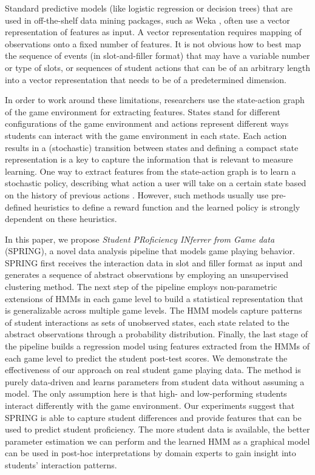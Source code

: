 \documentclass{sigchi}
\def\algname{SPRING\xspace}
\begin{document}
  

Standard predictive models (like logistic regression or decision trees)  that are used in off-the-shelf data mining packages, such as Weka \cite{hall2009weka}, often use a vector representation of features as input. 
A vector representation requires mapping of observations onto a fixed number of features.
It is not obvious how to best map the sequence of events (in slot-and-filler format) that may have a variable number or type of slots, or sequences of student actions that can be of an arbitrary length into a vector representation that needs to be of a predetermined dimension.

In order to work around these limitations, researchers use the state-action graph of the game environment for extracting features. 
States stand for different configurations of the game environment and actions represent different ways students can interact with the game environment in each state.
Each action results in a (stochastic) transition between states and defining a compact state representation is a key to capture the information that is relevant to measure learning.
One way to extract features from the state-action graph is to learn a stochastic policy, describing what action a user will take on a certain state based on the history of previous actions \cite{lee2014learning, liu2013predicting}.
However, such methods usually use pre-defined heuristics to define a reward function and the learned policy is strongly dependent on these
heuristics.

In this paper, we propose \textit{Student PRoficiency INferrer from Game data} (SPRING), a novel data analysis pipeline that models game playing behavior.
\algname first receives the interaction data in slot and filler format as input and generates a sequence of abstract observations by employing an unsupervised clustering method. 
The next step of the pipeline employs non-parametric extensions of HMMs in each game level to build a statistical representation that is generalizable across multiple game levels. 
The HMM models capture patterns of student interactions as sets of unobserved states, each state related to the abstract observations through a probability distribution. 
Finally, the last stage of the pipeline builds a regression model using features extracted from the HMMs of each game level to predict the student post-test scores.
We demonstrate the effectiveness of our approach on real student game playing data.
The method is purely data-driven and learns parameters from student data without assuming a model. 
The only assumption here is that high- and low-performing students interact differently with the game environment.
Our experiments suggest that \algname is able to capture student differences and provide features that can be used to predict student proficiency.
The more student data is available, the better parameter estimation we can perform and the learned HMM as a graphical model can be used in post-hoc interpretations by domain experts to gain insight into students' interaction patterns.
\end{document}
